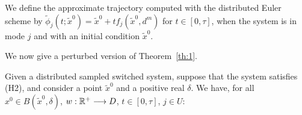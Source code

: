 We define the approximate trajectory computed with the distributed
Euler scheme by $\tilde{\phi}_{j}(t;\tilde{x}^0) = \tilde x^0
+ t f_{j}(\tilde x^0,d^m)$ for $t \in [0,\tau]$, when the
system is in mode $j$ and with an initial condition $\tilde
x^0$. 

We now give a perturbed version of Theorem~\ref{th:1}.
\begin{theorem}\label{th:1_dist}
  Given a distributed sampled switched system, suppose that
  the system satisfies (H2), and consider a point $\tilde{x}^0$
  and a positive real $\delta$.
  We have, for all $x^0\in B(\tilde{x}^0,\delta)$, $w : \mathbb{R}^+ \longrightarrow 
  D$, $t\in [0,\tau]$, $j\in U$:


\end{theorem}

